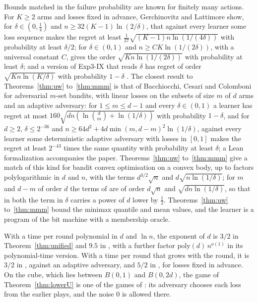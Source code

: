 \documentclass[11pt]{amsart}
\theoremstyle{definition}
\numberwithin{equation}{section}
\begin{document}
Bounds matched in the failure probability are known for finitely many actions. For $K\ge2$ arms and losses fixed in advance, Gerchinovitz and Lattimore \cite[Theorem~1]{GL16} show, for $\delta\in(0,\frac14)$ and $n\ge32(K-1)\ln(2/\delta)$, that against every learner some loss sequence makes the regret at least $\frac1{27}\sqrt{(K-1)n\ln(1/(4\delta))}$ with probability at least $\delta/2$; for $\delta\in(0,1)$ and $n\ge C K\ln(1/(2\delta))$, with a universal constant $C$, \cite[Theorem~17.4]{LS20} gives the order $\sqrt{Kn\ln(1/(2\delta))}$ with probability at least $\delta$; and a version of Exp3-IX that reads $\delta$ has regret of order $\sqrt{Kn\ln(K/\delta)}$ with probability $1-\delta$ \cite[Chapters~12 and~17]{LS20}. The closest result to Theorems~\ref{thm:uw} to~\ref{thm:mmm} is that of Bacchiocchi, Cesari and Colomboni \cite[Theorems~1 and~3]{BCC26} for adversarial $m$-set bandits, with linear losses on the subsets of size $m$ of $d$ arms and an adaptive adversary: for $1\le m\le d-1$ and every $\delta\in(0,1)$ a learner has regret at most $160\sqrt{dn(\ln\binom dm+\ln(1/\delta))}$ with probability $1-\delta$, and for $d\ge2$, $\delta\le2^{-36}$ and $n\ge64d^2+4d\min(m,d-m)^2\ln(1/\delta)$, against every learner some deterministic adaptive adversary with losses in $[0,1]$ makes the regret at least $2^{-43}$ times the same quantity with probability at least $\delta$; a Lean formalization accompanies the paper. Theorems~\ref{thm:uw} to~\ref{thm:mmm} give a match of this kind for bandit convex optimisation on a convex body, up to factors polylogarithmic in $d$ and $n$, with the terms $d^{3/2}\sqrt n$ and $d\sqrt{n\ln(1/\delta)}$; for $m$ and $d-m$ of order $d$ the terms of \cite{BCC26} are of order $d\sqrt n$ and $\sqrt{dn\ln(1/\delta)}$, so that in both the term in $\delta$ carries a power of $d$ lower by $\frac12$. Theorems~\ref{thm:uw} to~\ref{thm:mmm} bound the minimax quantile and mean values, and the learner is a program of the bit machine with a membership oracle.

With a time per round polynomial in $d$ and $\ln n$, the exponent of $d$ is $3/2$ in Theorem~\ref{thm:unified} and $9.5$ in \cite[Theorem~1]{BEL21}, with a further factor $\mathrm{poly}(d)\,n^{o(1)}$ in its polynomial-time version. With a time per round that grows with the round, it is $3/2$ in \cite[Section~4 and Proposition~13]{BJLR26}, against an adaptive adversary, and $5/2$ in \cite[Chapter~11]{Lat24}, for losses fixed in advance. On the cube, which lies between $B(0,1)$ and $B(0,2d)$, the game of Theorem~\ref{thm:lowerU} is one of the games of \cite[Section~3]{BJLR26}: its adversary chooses each loss from the earlier plays, and the noise $0$ is allowed there.
\end{document}
